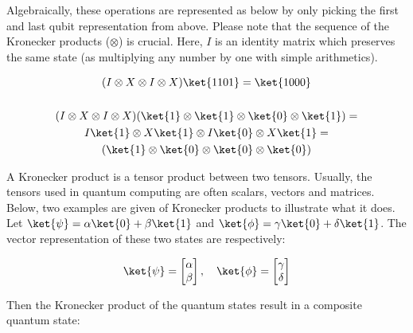\documentclass[../main.tex]{subfiles}
\begin{document}
Algebraically, these operations are represented as below by only picking the first and last qubit representation from above. Please note that the sequence of the Kronecker products ($\otimes$) is crucial. Here, $I$ is an identity matrix which preserves the same state (as multiplying any number by one with simple arithmetics).

\begin{gather*}
    (I \otimes X \otimes I \otimes X) \ket{1101} = \ket{1000}\\
    \\
    (I \otimes X \otimes I \otimes X) (\ket{1} \otimes \ket{1} \otimes \ket{0} \otimes \ket{1}) = \\
    I\ket{1} \otimes X\ket{1} \otimes I\ket{0} \otimes X\ket{1} = \\
    (\ket{1} \otimes \ket{0} \otimes \ket{0} \otimes \ket{0})
\label{eq: multi_quantum_circuit_representation}
\end{gather*}

A Kronecker product is a tensor product between two tensors. Usually, the tensors used in quantum computing are often scalars, vectors and matrices. Below, two examples are given of Kronecker products to illustrate what it does. Let $\ket{\psi} = \alpha \ket{0} + \beta \ket{1}$ and $\ket{\phi} = \gamma \ket{0} + \delta \ket{1}$. The vector representation of these two states are respectively:

\begin{equation*}
    \ket{\psi} = \begin{bmatrix} \alpha \\ \beta \end{bmatrix}, \quad  \ket{\phi} = \begin{bmatrix} \gamma \\ \delta \end{bmatrix}
    \label{eq: kronecker_vector_definition}
\end{equation*}

Then the Kronecker product of the quantum states result in a composite quantum state:
\end{document}
